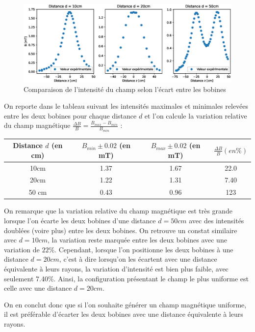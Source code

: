 \documentclass[12pt]{article}
\begin{document}
\begin{figure}[h!]
    \begin{center}
        \includegraphics[scale=0.6]{img/ChampDistance.eps}
    \end{center}
    \caption{Comparaison de l'intensité du champ selon l'écart entre les bobines}
\end{figure}

On reporte dans le tableau suivant les intensités maximales et minimales relevées entre les deux bobines pour chaque distance $d$ et l'on calcule la variation relative du champ magnétique
$\frac{\Delta B}{B} = \frac{B_{max} - B_{min}}{B_{min}}$ :

\begin{table}[h!]
    \begin{center}
        \begin{tabular}{c|c|c|c}
            Distance $d$ (en cm) & $B_{min} \pm 0.02$ (en mT) & $B_{max} \pm 0.02$ (en mT) & $\frac{\Delta B}{B} (en \%)$ \\ \hline
            10cm & 1.37 & 1.67 & 22.0 \\
            20cm & 1.22 & 1.31 & 7.40 \\
            50 cm & 0.43 & 0.96 & 123 \\
        \end{tabular}
    \end{center}
\end{table}

On remarque que la variation relative du champ magnétique est très grande lorsque l'on écarte les deux bobines d'une distance $d=50cm$ avec des intensités doublées (voire plus) entre les deux bobines. 
On retrouve un constat similaire avec $d=10cm$, la variation reste marquée entre les deux bobines avec une variation de $22\%$. Cependant, lorsque l'on positionne les deux bobines à une distance $d = 20cm$,
c'est à dire lorsqu'on les écartent avec une distance équivalente à leurs rayons, la variation d'intensité est bien plus faible, avec seulement 7.40\%. Ainsi, la configuration présentant 
le champ le plus uniforme est celle avec une distance $d=20cm$.

On en conclut donc que si l'on souhaite générer un champ magnétique uniforme, il est préférable d'écarter les deux bobines avec une distance équivalente à leurs rayons.

\newpage
\end{document}
